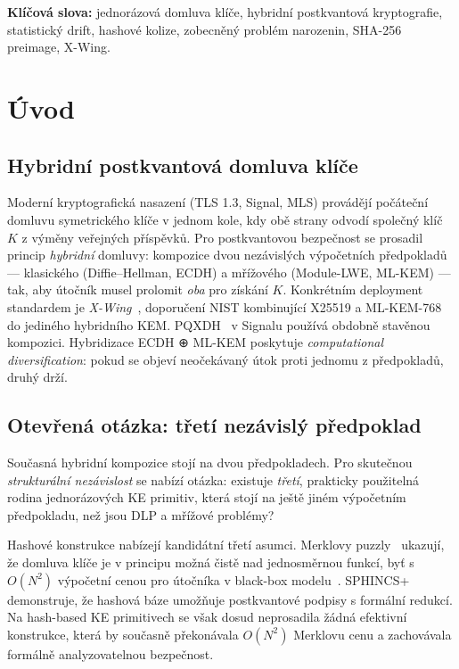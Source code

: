 \documentclass[11pt,a4paper]{article}
\begin{document}
\medskip
\textbf{Klíčová slova:} jednorázová domluva klíče, hybridní postkvantová kryptografie, statistický drift, hashové kolize, zobecněný problém narozenin, SHA-256 preimage, X-Wing.

\section{Úvod}\label{sec:intro}

\subsection{Hybridní postkvantová domluva klíče}\label{sec:hybrid-pq}

Moderní kryptografická nasazení (TLS 1.3, Signal, MLS) provádějí počáteční domluvu symetrického klíče v jednom kole, kdy obě strany odvodí společný klíč $K$ z výměny veřejných příspěvků. Pro postkvantovou bezpečnost se prosadil princip \emph{hybridní} domluvy: kompozice dvou nezávislých výpočetních předpokladů --- klasického (Diffie--Hellman, ECDH) a mřížového (Module-LWE, ML-KEM) --- tak, aby útočník musel prolomit \emph{oba} pro získání $K$. Konkrétním deployment standardem je \emph{X-Wing}~\cite{xwing}, doporučení NIST kombinující X25519 a ML-KEM-768 do jediného hybridního KEM. PQXDH~\cite{PQXDH} v Signalu používá obdobně stavěnou kompozici. Hybridizace ECDH ⊕ ML-KEM poskytuje \emph{computational diversification}: pokud se objeví neočekávaný útok proti jednomu z předpokladů, druhý drží.

\subsection{Otevřená otázka: třetí nezávislý předpoklad}\label{sec:third-assumption}

Současná hybridní kompozice stojí na dvou předpokladech. Pro skutečnou \emph{strukturální nezávislost} se nabízí otázka: existuje \emph{třetí}, prakticky použitelná rodina jednorázových KE primitiv, která stojí na ještě jiném výpočetním předpokladu, než jsou DLP a mřížové problémy?

Hashové konstrukce nabízejí kandidátní třetí asumci. Merklovy puzzly~\cite{Merkle1978} ukazují, že domluva klíče je v principu možná čistě nad jednosměrnou funkcí, byť s $O(N^2)$ výpočetní cenou pro útočníka v black-box modelu~\cite{IR1989}. SPHINCS+~\cite{SPHINCS+} demonstruje, že hashová báze umožňuje postkvantové podpisy s formální redukcí. Na hash-based KE primitivech se však dosud neprosadila žádná efektivní konstrukce, která by současně překonávala $O(N^2)$ Merklovu cenu a zachovávala formálně analyzovatelnou bezpečnost.
\end{document}
